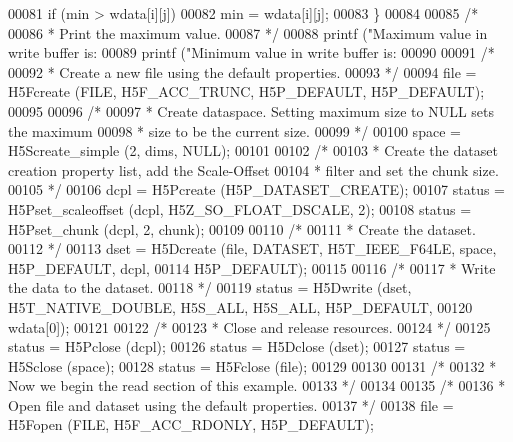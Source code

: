 \begin{DoxyCode}
00081             \textcolor{keywordflow}{if} (min > wdata[i][j])
00082                 min = wdata[i][j];
00083         \}
00084 
00085     \textcolor{comment}{/*}
00086 \textcolor{comment}{     * Print the maximum value.}
00087 \textcolor{comment}{     */}
00088     printf (\textcolor{stringliteral}{"Maximum value in write buffer is: %
00089     printf (\textcolor{stringliteral}{"Minimum value in write buffer is: %
00090 
00091     \textcolor{comment}{/*}
00092 \textcolor{comment}{     * Create a new file using the default properties.}
00093 \textcolor{comment}{     */}
00094     file = H5Fcreate (FILE, H5F\_ACC\_TRUNC, H5P\_DEFAULT, H5P\_DEFAULT);
00095 
00096     \textcolor{comment}{/*}
00097 \textcolor{comment}{     * Create dataspace.  Setting maximum size to NULL sets the maximum}
00098 \textcolor{comment}{     * size to be the current size.}
00099 \textcolor{comment}{     */}
00100     space = H5Screate\_simple (2, dims, NULL);
00101 
00102     \textcolor{comment}{/*}
00103 \textcolor{comment}{     * Create the dataset creation property list, add the Scale-Offset}
00104 \textcolor{comment}{     * filter and set the chunk size.}
00105 \textcolor{comment}{     */}
00106     dcpl = H5Pcreate (H5P\_DATASET\_CREATE);
00107     status = H5Pset\_scaleoffset (dcpl, H5Z\_SO\_FLOAT\_DSCALE, 2);
00108     status = H5Pset\_chunk (dcpl, 2, chunk);
00109 
00110     \textcolor{comment}{/*}
00111 \textcolor{comment}{     * Create the dataset.}
00112 \textcolor{comment}{     */}
00113     dset = H5Dcreate (file, DATASET, H5T\_IEEE\_F64LE, space, H5P\_DEFAULT, dcpl,
00114                 H5P\_DEFAULT);
00115 
00116     \textcolor{comment}{/*}
00117 \textcolor{comment}{     * Write the data to the dataset.}
00118 \textcolor{comment}{     */}
00119     status = H5Dwrite (dset, H5T\_NATIVE\_DOUBLE, H5S\_ALL, H5S\_ALL, H5P\_DEFAULT,
00120                 wdata[0]);
00121 
00122     \textcolor{comment}{/*}
00123 \textcolor{comment}{     * Close and release resources.}
00124 \textcolor{comment}{     */}
00125     status = H5Pclose (dcpl);
00126     status = H5Dclose (dset);
00127     status = H5Sclose (space);
00128     status = H5Fclose (file);
00129 
00130 
00131     \textcolor{comment}{/*}
00132 \textcolor{comment}{     * Now we begin the read section of this example.}
00133 \textcolor{comment}{     */}
00134 
00135     \textcolor{comment}{/*}
00136 \textcolor{comment}{     * Open file and dataset using the default properties.}
00137 \textcolor{comment}{     */}
00138     file = H5Fopen (FILE, H5F\_ACC\_RDONLY, H5P\_DEFAULT);
}}
\end{DoxyCode}
